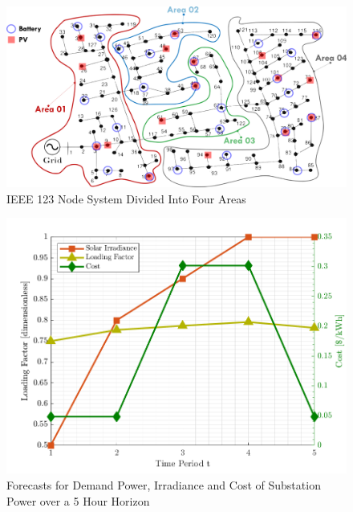 \documentclass[../../outputs/main.tex]{subfiles}
\begin{document}
\begin{figure}[t]
    \centering
    \includegraphics[width=\linewidth]{../figures/ieee123-FourAreas-pv20-batt30.png}
    \caption{IEEE 123 Node System Divided Into Four Areas}
    \label{fig:ieee123-four-area-figure}
    \vspace{-4mm}
\end{figure}


\begin{figure}[t]
    \centering
    \includegraphics[height=0.25\textheight]{../figures/T5-inputCurves/InputCurves_Horizon_5.png}
    \caption{Forecasts for Demand Power, Irradiance and Cost of Substation Power over a 5 Hour Horizon}
    \label{fig:inputCurve-5}
    \vspace{-4mm}
\end{figure}
\end{document}
